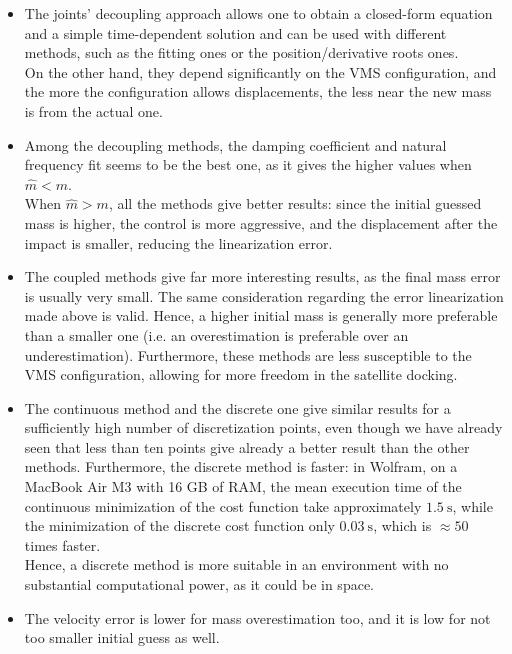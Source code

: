 \documentclass[a4paper,12pt,oneside]{report}
\begin{document}
\begin{itemize}
  \item The joints' decoupling approach allows one to obtain a closed-form equation and a simple time-dependent solution and can be used with different methods, such as the fitting ones or the position/derivative roots ones.\\
    On the other hand, they depend significantly on the VMS configuration, and the more the configuration allows displacements, the less near the new mass is from the actual one.
  \item Among the decoupling methods, the damping coefficient and natural frequency fit seems to be the best one, as it gives the higher values when $\hat{m}<m$.\\
    When $\hat{m}>m$, all the methods give better results: since the initial guessed mass is higher, the control is more aggressive, and the displacement after the impact is smaller, reducing the linearization error.
  \item The coupled methods give far more interesting results, as the final mass error is usually very small. The same consideration regarding the error linearization made above is valid. Hence, a higher initial mass is generally more preferable than a smaller one (i.e. an overestimation is preferable over an underestimation).
    Furthermore, these methods are less susceptible to the VMS configuration, allowing for more freedom in the satellite docking.
  \item The continuous method and the discrete one give similar results for a sufficiently high number of discretization points, even though we have already seen that less than ten points give already a better result than the other methods. Furthermore, the discrete method is faster: in Wolfram, on a MacBook Air M3 with 16 GB of RAM, the mean execution time of the continuous minimization of the cost function take approximately $\SI{1.5}{\second}$, while the minimization of the discrete cost function only $\SI{0.03}{\second}$, which is $\approx 50$ times faster.\\
    Hence, a discrete method is more suitable in an environment with no substantial computational power, as it could be in space.
  \item The velocity error is lower for mass overestimation too, and it is low for not too smaller initial guess as well.
\end{itemize}
\newpage
\end{document}

